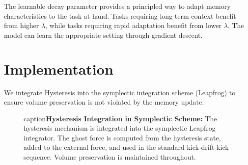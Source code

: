 \documentclass[12pt,a4paper]{article}
\begin{document}
The learnable decay parameter provides a principled way to adapt memory characteristics to the task at hand. Tasks requiring long-term context benefit from higher $\lambda$, while tasks requiring rapid adaptation benefit from lower $\lambda$. The model can learn the appropriate setting through gradient descent.

\section{Implementation}

We integrate Hysteresis into the symplectic integration scheme (Leapfrog) to ensure volume preservation is not violated by the memory update.

\begin{figure}[htbp]
\centering
{}
caption{\textbf{Hysteresis Integration in Symplectic Scheme:} The hysteresis 
         mechanism is integrated into the symplectic Leapfrog integrator. 
         The ghost force is computed from the hysteresis state, added to 
         the external force, and used in the standard kick-drift-kick 
         sequence. Volume preservation is maintained throughout.}
\label{fig:hysteresis_integration}
\end{figure}
\end{document}
